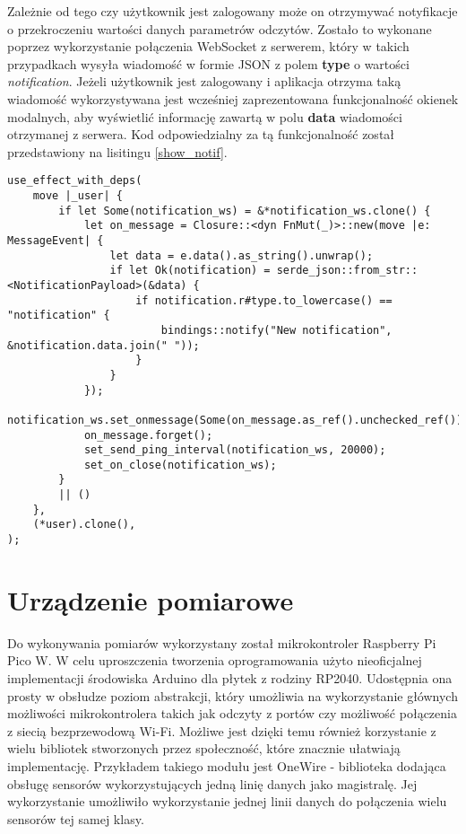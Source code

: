 Zależnie od tego czy użytkownik jest zalogowany może on otrzymywać notyfikacje o przekroczeniu
wartości danych parametrów odczytów. Zostało to wykonane poprzez wykorzystanie połączenia 
WebSocket z serwerem, który w takich przypadkach wysyła wiadomość w formie JSON z polem
\textbf{type} o wartości \textit{notification}. Jeżeli użytkownik jest zalogowany i aplikacja
otrzyma taką wiadomość wykorzystywana jest wcześniej zaprezentowana funkcjonalność okienek modalnych,
aby wyświetlić informację zawartą w polu \textbf{data} wiadomości otrzymanej z serwera.
Kod odpowiedzialny za tą funkcjonalność został przedstawiony na lisitingu \ref{show_notif}.
\begin{lstlisting}[caption={Implementacja wyświetlania powiadomień},label={show_notif},captionpos=b]
use_effect_with_deps(
    move |_user| {
        if let Some(notification_ws) = &*notification_ws.clone() {
            let on_message = Closure::<dyn FnMut(_)>::new(move |e: MessageEvent| {
                let data = e.data().as_string().unwrap();
                if let Ok(notification) = serde_json::from_str::<NotificationPayload>(&data) {
                    if notification.r#type.to_lowercase() == "notification" {
                        bindings::notify("New notification", &notification.data.join(" "));
                    }
                }
            });
            notification_ws.set_onmessage(Some(on_message.as_ref().unchecked_ref()));
            on_message.forget();
            set_send_ping_interval(notification_ws, 20000);
            set_on_close(notification_ws);
        }
        || ()
    },
    (*user).clone(),
);
\end{lstlisting}


\section{Urządzenie pomiarowe}
Do wykonywania pomiarów wykorzystany został mikrokontroler Raspberry Pi Pico W.
W celu uproszczenia tworzenia oprogramowania użyto nieoficjalnej implementacji
środowiska Arduino dla płytek z rodziny RP2040. Udostępnia ona prosty
w obsłudze poziom abstrakcji, który umożliwia na wykorzystanie głównych
możliwości mikrokontrolera takich jak odczyty z portów czy możliwość połączenia
z siecią bezprzewodową Wi-Fi. Możliwe jest dzięki temu również korzystanie z
wielu bibliotek stworzonych przez społeczność, które znacznie ułatwiają implementację.
Przykładem takiego modułu jest OneWire - biblioteka dodająca obsługę sensorów 
wykorzystujących jedną linię danych jako magistralę.
Jej wykorzystanie umożliwiło wykorzystanie jednej linii danych do połączenia wielu 
sensorów tej samej klasy.

